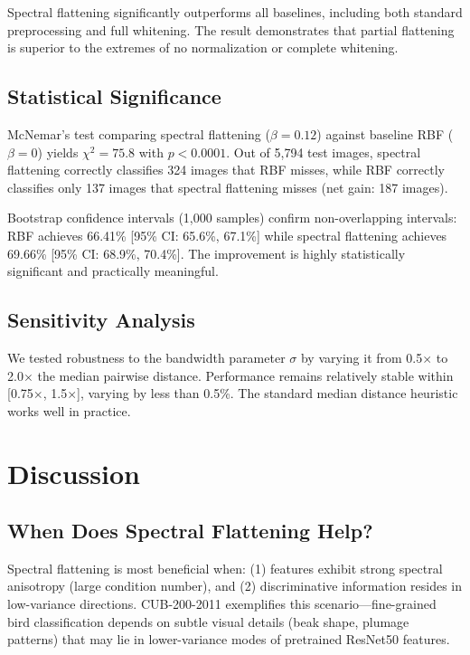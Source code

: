 \documentclass[11pt]{article}
\begin{document}
Spectral flattening significantly outperforms all baselines, including both standard preprocessing and full whitening. The result demonstrates that partial flattening is superior to the extremes of no normalization or complete whitening.

\subsection{Statistical Significance}

McNemar's test comparing spectral flattening ($\beta=0.12$) against baseline RBF ($\beta=0$) yields $\chi^2 = 75.8$ with $p < 0.0001$. Out of 5,794 test images, spectral flattening correctly classifies 324 images that RBF misses, while RBF correctly classifies only 137 images that spectral flattening misses (net gain: 187 images).

Bootstrap confidence intervals (1,000 samples) confirm non-overlapping intervals: RBF achieves 66.41\% [95\% CI: 65.6\%, 67.1\%] while spectral flattening achieves 69.66\% [95\% CI: 68.9\%, 70.4\%]. The improvement is highly statistically significant and practically meaningful.

\subsection{Sensitivity Analysis}

We tested robustness to the bandwidth parameter $\sigma$ by varying it from 0.5$\times$ to 2.0$\times$ the median pairwise distance. Performance remains relatively stable within [0.75$\times$, 1.5$\times$], varying by less than 0.5\%. The standard median distance heuristic works well in practice.

\section{Discussion}

\subsection{When Does Spectral Flattening Help?}

Spectral flattening is most beneficial when: (1) features exhibit strong spectral anisotropy (large condition number), and (2) discriminative information resides in low-variance directions. CUB-200-2011 exemplifies this scenario---fine-grained bird classification depends on subtle visual details (beak shape, plumage patterns) that may lie in lower-variance modes of pretrained ResNet50 features.
\end{document}
